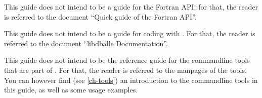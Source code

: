 This guide does not intend to be a guide for the Fortran API: for that, the
reader is referred to the document ``Quick guide of the Fortran
API''\cite{FAPI}.

This guide does not intend to be a guide for coding with \dballe{}.  For that,
the reader is referred to the document ``libdballe
Documentation''\cite{LibDoc}.

This guide does not intend to be the reference guide for the commandline tools
that are part of \dballe{}.  For that, the reader is referred to the
manpages\cite{DbaTblMan}\cite{DbaMsgMan}\cite{DbaDbMan} of the tools.  You can
however find (see \ref{ch-tools}) an introduction to the commandline tools in
this guide, as well as some usage examples.

